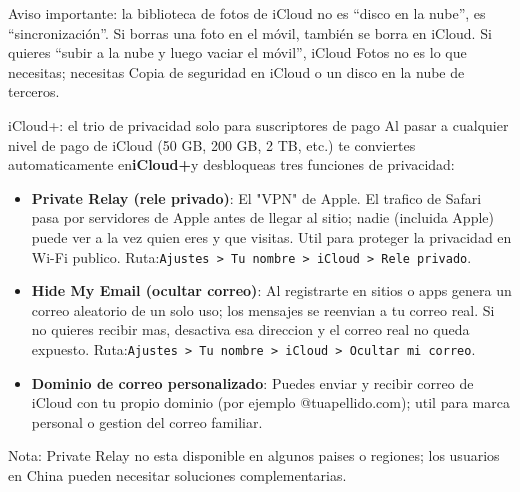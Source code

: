 Aviso importante: la biblioteca de fotos de iCloud no es “disco en la nube”, es “sincronización”. Si borras una foto en el móvil, también se borra en iCloud. Si quieres “subir a la nube y luego vaciar el móvil”, iCloud Fotos no es lo que necesitas; necesitas Copia de seguridad en iCloud o un disco en la nube de terceros.

\begin{tcbinfo}{iCloud+: el trio de privacidad solo para suscriptores de pago}
Al pasar a cualquier nivel de pago de iCloud (50 GB, 200 GB, 2 TB, etc.) te conviertes automaticamente en\textbf{iCloud+}y desbloqueas tres funciones de privacidad:

\begin{itemize}
  \item \textbf{Private Relay (rele privado)}: El "VPN" de Apple. El trafico de Safari pasa por servidores de Apple antes de llegar al sitio; nadie (incluida Apple) puede ver a la vez quien eres y que visitas. Util para proteger la privacidad en Wi-Fi publico. Ruta:\texttt{Ajustes > Tu nombre > iCloud > Rele privado}.
  \item \textbf{Hide My Email (ocultar correo)}: Al registrarte en sitios o apps genera un correo aleatorio de un solo uso; los mensajes se reenvian a tu correo real. Si no quieres recibir mas, desactiva esa direccion y el correo real no queda expuesto. Ruta:\texttt{Ajustes > Tu nombre > iCloud > Ocultar mi correo}.
  \item \textbf{Dominio de correo personalizado}: Puedes enviar y recibir correo de iCloud con tu propio dominio (por ejemplo @tuapellido.com); util para marca personal o gestion del correo familiar.
\end{itemize}

Nota: Private Relay no esta disponible en algunos paises o regiones; los usuarios en China pueden necesitar soluciones complementarias.

\end{tcbinfo}

